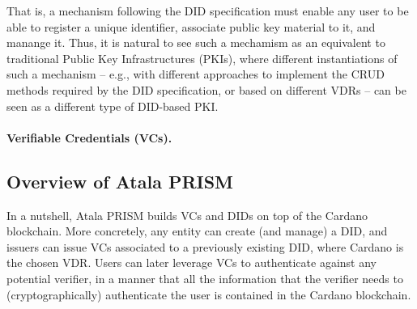 That is, a mechanism following the DID specification must enable any user to be
able to register a unique identifier, associate public key material to it, and
manange it. Thus, it is natural to see such a mechamism as an equivalent to
traditional Public Key Infrastructures (PKIs), where different instantiations of
such a mechanism -- e.g., with different approaches to implement the CRUD
methods required by the DID specification, or based on different VDRs -- can be
seen as a different type of DID-based PKI.


\paragraph{Verifiable Credentials (VCs).} %

\subsection{Overview of Atala PRISM}
\label{ssec:overview-prism}

In a nutshell, Atala PRISM builds VCs and DIDs on top of the Cardano blockchain.
More concretely, any entity can create (and manage) a DID, and issuers can issue
VCs associated to a previously existing DID, where Cardano is the chosen VDR.
Users can later leverage VCs to authenticate against any potential verifier, in
a manner that all the information that the verifier needs to (cryptographically)
authenticate the user is contained in the Cardano blockchain.



